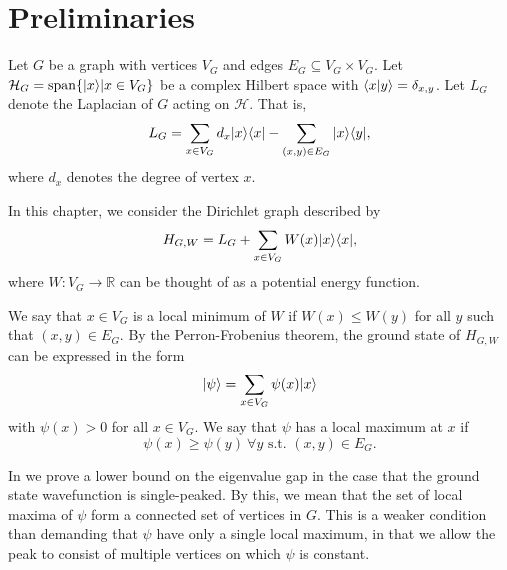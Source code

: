 \section{Preliminaries}
\label{sec:preliminaries}

Let $G$ be a graph with vertices $V_G$ and edges $E_G \subseteq V_G
\times V_G$. Let $\mathcal{H}_G = \mathrm{span} \{ |x\rangle | x \in V_G \}$ be
a complex Hilbert space with $\langle x|y\rangle = \delta_{x,y}$. Let $L_G$
denote the Laplacian of $G$ acting on $\mathcal{H}$. That is,
\begin{equation}
L_G = \sum_{x \in V_G} d_x |x\rangle \langle x| - \sum_{(x,y) \in E_G} |x\rangle \langle y|,
\end{equation}
where $d_x$ denotes the degree of vertex $x$. 

In this chapter, we consider the Dirichlet graph described by
\begin{equation}
\label{HGW}
H_{G,W} = L_G + \sum_{x \in V_G} W(x) |x\rangle \langle x|,
\end{equation}
where $W:V_G \to \mathbb{R}$ can be thought of as a potential energy
function. 

We say that $x \in V_G$ is a local minimum of $W$ if $W(x) \leq W(y)$ for
all $y$ such that $(x,y) \in E_G$. By the Perron-Frobenius theorem,
the ground state of $H_{G,W}$ can be expressed in the form 
\begin{equation}
|\psi\rangle = \sum_{x \in V_G} \psi(x) |x\rangle
\end{equation}
with $\psi(x) > 0$ for all $x \in V_G$. We say that $\psi$ has a local
maximum at $x$ if 
\begin{equation}
\label{psimax}
\psi(x) \geq \psi(y) \  \forall y \textrm{ s.t. } (x,y) \in E_G.
\end{equation}

In  we prove a lower bound on the eigenvalue
gap in the case that the ground state wavefunction is
single-peaked. By this, we mean that the set of local maxima of $\psi$ 
form a connected set of vertices in $G$. This is a weaker condition
than demanding that $\psi$ have only a single local maximum, in that
we allow the peak to consist of multiple vertices on which $\psi$ is
constant.

